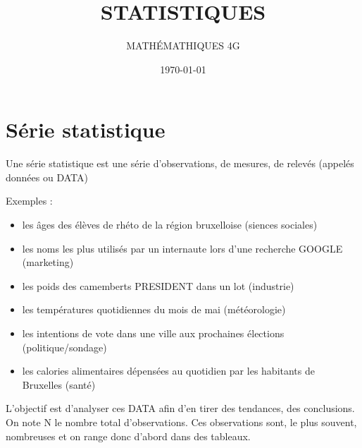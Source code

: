 \documentclass[utf8, a4paper, 12 pt]{article}
\title{\LARGE \textbf{STATISTIQUES}}
\author{MATH\'EMATHIQUES 4G}
\date{\today}
\begin{document}
    \everymath{\displaystyle}

    \begin{titlepage}
        
        \maketitle
    \end{titlepage}
    
    \setcounter{page}{2}

    \section{Série statistique}
    Une série statistique est une série d'observations, de mesures, de relevés (appelés données ou DATA)%

    Exemples : \begin{itemize}
        \item les âges des élèves de rhéto de la région bruxelloise (siences sociales)
        \item les noms les plus utilisés par un internaute lors d'une recherche GOOGLE (marketing)
        \item les poids des camemberts PRESIDENT dans un lot (industrie)
        \item les temp\'eratures quotidiennes du mois de mai (m\'et\'eorologie)
        \item les intentions de vote dans une ville aux prochaines \'elections\\ (politique/sondage)
        \item les calories alimentaires d\'epens\'ees au quotidien par les habitants de \\Bruxelles (sant\'e)
    \end{itemize} \vspace{1\baselineskip}

   
    L'objectif est d'analyser ces DATA afin d'en tirer des tendances, des conclusions.
    On note N le nombre total d'observations.
    Ces observations sont, le plus souvent, nombreuses et on range donc d'abord dans des tableaux.
\end{document}
